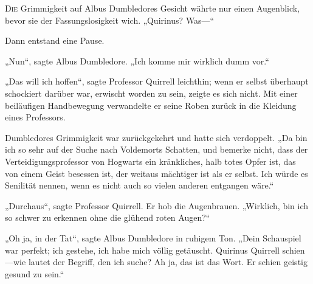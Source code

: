
\lettrine{D}{ie} Grimmigkeit auf Albus Dumbledores Gesicht währte nur einen Augenblick, bevor sie der Fassungslosigkeit wich.
„Quirinus? Was—“

Dann entstand eine Pause.

„Nun“, sagte Albus Dumbledore. „Ich komme mir wirklich dumm vor.“

„Das will ich hoffen“, sagte Professor Quirrell leichthin; wenn er selbst überhaupt schockiert darüber war, erwischt worden zu sein, zeigte es sich nicht. Mit einer beiläufigen Handbewegung verwandelte er seine Roben zurück in die Kleidung eines Professors.

Dumbledores Grimmigkeit war zurückgekehrt und hatte sich verdoppelt.
„Da bin ich so sehr auf der Suche nach Voldemorts Schatten, und bemerke nicht, dass der Verteidigungsprofessor von Hogwarts ein kränkliches, halb totes Opfer ist, das von einem Geist besessen ist, der weitaus mächtiger ist als er selbst. Ich würde es Senilität nennen, wenn es nicht auch so vielen anderen entgangen wäre.“

„Durchaus“, sagte Professor Quirrell. Er hob die Augenbrauen. „Wirklich, bin ich so schwer zu erkennen ohne die glühend roten Augen?“

„Oh ja, in der Tat“, sagte Albus Dumbledore in ruhigem Ton. „Dein Schauspiel war perfekt; ich gestehe, ich habe mich völlig getäuscht. Quirinus Quirrell schien—wie lautet der Begriff, den ich suche? Ah ja, das ist das Wort. Er schien geistig gesund zu sein.“


